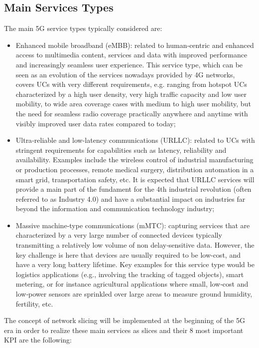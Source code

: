 \documentclass{report}
\begin{document}
\subsection{Main Services Types}
The main 5G service types typically considered are:
\begin{itemize}
\item Enhanced mobile broadband (eMBB): related to human‐centric and enhanced access to multimedia content, services and data with improved performance and increasingly seamless user experience. This service type, which can be seen as an evolution of the services nowadays provided by
4G networks, covers UCs with very different requirements, e.g. ranging from hotspot UCs characterized by a high user density, very high traffic capacity and low user mobility, to wide area coverage cases with medium to high user mobility, but the need for seamless radio coverage practically
anywhere and anytime with visibly improved user data rates compared to today;
\end{itemize}
\begin{itemize}
\item Ultra‐reliable and low-latency communications (URLLC): related to UCs with stringent requirements for capabilities such as latency, reliability and availability. Examples include the wireless
control of industrial manufacturing or production processes, remote medical surgery, distribution automation in a smart grid, transportation safety, etc. It is expected that URLLC services will provide a main part of the fundament for the 4th industrial revolution (often referred to as
Industry 4.0) and have a substantial impact on industries far beyond the information and communication technology industry;
\end{itemize}
\begin{itemize}
\item Massive machine‐type communications (mMTC): capturing services that are characterized by
a very large number of connected devices typically transmitting a relatively low volume of non delay‐sensitive data. However, the key challenge is here that devices are usually required to be
low-cost, and have a very long battery lifetime. Key examples for this service type would be logistics applications (e.g., involving the tracking of tagged objects), smart metering, or for instance
agricultural applications where small, low‐cost and low‐power sensors are sprinkled over large
areas to measure ground humidity, fertility, etc.
\end{itemize}
The concept of network slicing will be implemented at the beginning of the 5G era in order to realize these main services as slices and their 8 most important KPI are the following:
\end{document}
